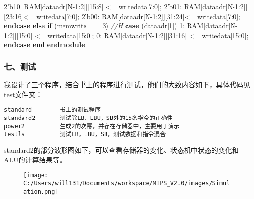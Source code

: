 \documentclass[]{article}
\newenvironment{Shaded}{}{}
\newcommand{\KeywordTok}[1]{\textcolor[rgb]{0.00,0.44,0.13}{\textbf{#1}}}
\newcommand{\DecValTok}[1]{\textcolor[rgb]{0.25,0.63,0.44}{#1}}
\newcommand{\BaseNTok}[1]{\textcolor[rgb]{0.25,0.63,0.44}{#1}}
\newcommand{\CommentTok}[1]{\textcolor[rgb]{0.38,0.63,0.69}{\textit{#1}}}
\newcommand{\NormalTok}[1]{#1}
\begin{document}
\begin{Shaded}
\begin{Highlighting}[]
                    \BaseNTok{2'b10}\NormalTok{:  RAM[dataadr[N-}\DecValTok{1}\NormalTok{:}\DecValTok{2}\NormalTok{]][}\DecValTok{15}\NormalTok{:}\DecValTok{8}\NormalTok{] <= writedata[}\DecValTok{7}\NormalTok{:}\DecValTok{0}\NormalTok{];}
                    \BaseNTok{2'b01}\NormalTok{:  RAM[dataadr[N-}\DecValTok{1}\NormalTok{:}\DecValTok{2}\NormalTok{]][}\DecValTok{23}\NormalTok{:}\DecValTok{16}\NormalTok{]<= writedata[}\DecValTok{7}\NormalTok{:}\DecValTok{0}\NormalTok{];}
                    \BaseNTok{2'b00}\NormalTok{:  RAM[dataadr[N-}\DecValTok{1}\NormalTok{:}\DecValTok{2}\NormalTok{]][}\DecValTok{31}\NormalTok{:}\DecValTok{24}\NormalTok{]<= writedata[}\DecValTok{7}\NormalTok{:}\DecValTok{0}\NormalTok{];}
                \KeywordTok{endcase}
        \KeywordTok{else} \KeywordTok{if}\NormalTok{ (memwrite===}\DecValTok{3}\NormalTok{) }\CommentTok{//H}
            \KeywordTok{case}\NormalTok{ (dataadr[}\DecValTok{1}\NormalTok{])}
                    \DecValTok{1}\NormalTok{:  RAM[dataadr[N-}\DecValTok{1}\NormalTok{:}\DecValTok{2}\NormalTok{]][}\DecValTok{15}\NormalTok{:}\DecValTok{0}\NormalTok{]  <= writedata[}\DecValTok{15}\NormalTok{:}\DecValTok{0}\NormalTok{];}
                    \DecValTok{0}\NormalTok{:  RAM[dataadr[N-}\DecValTok{1}\NormalTok{:}\DecValTok{2}\NormalTok{]][}\DecValTok{31}\NormalTok{:}\DecValTok{16}\NormalTok{] <= writedata[}\DecValTok{15}\NormalTok{:}\DecValTok{0}\NormalTok{];}
                \KeywordTok{endcase}
        \KeywordTok{end} 
\KeywordTok{endmodule}
\end{Highlighting}
\end{Shaded}

\subsubsection{七、测试}\label{header-n1995}

我设计了三个程序，结合书上的程序进行测试，他们的大致内容如下，具体代码见test文件夹：

\begin{verbatim}
standard		书上的测试程序
standard2		测试除LB，LBU，SB外的15条指令的正确性
power2			生成2的次幂，并存在存储器中，主要用于演示
testls			测试LB，LBU，SB，测试数据和指令混合
\end{verbatim}

standard2的部分波形图如下，可以查看存储器的变化、状态机中状态的变化和ALU的计算结果等。

\begin{figure}
\centering
\texttt{[image: C:/Users/will131/Documents/workspace/MIPS\_V2.0/images/Simulation.png]}
\caption{}
\end{figure}
\end{document}
